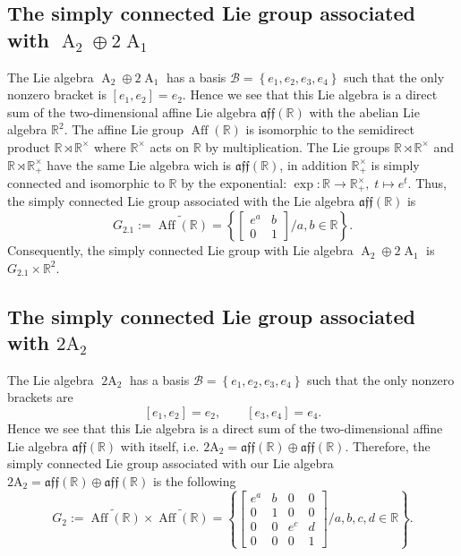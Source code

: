 \documentclass[12pt,a4paper,twoside]{article}
\theoremstyle{definition}
\begin{document}
\subsection{The simply connected Lie group associated with $\operatorname{A}_{2} \oplus 2\operatorname{A}_1$}
The Lie algebra $\operatorname{A}_{2} \oplus 2\operatorname{A}_1$ has a basis $\mathcal{B} = \left\lbrace e_1, e_2, e_3, e_4\right\rbrace$ such that the only nonzero bracket is $[e_1, e_2] = e_2$. Hence we see that this Lie algebra is a direct sum of the two-dimensional affine Lie algebra $\mathfrak{aff}(\mathbb{R})$ with the abelian Lie algebra $\mathbb{R}^2$. The affine Lie group $\operatorname{Aff}(\mathbb{R})$ is isomorphic to the semidirect product $\mathbb{R} \rtimes \mathbb{R}^{\times}$ where $\mathbb{R}^{\times}$ acts on $\mathbb{R}$ by multiplication. The Lie groups $\mathbb{R} \rtimes \mathbb{R}^{\times}$ and $\mathbb{R} \rtimes \mathbb{R}_{+}^{\times}$ have the same Lie algebra wich is $\mathfrak{aff}(\mathbb{R})$, in addition $\mathbb{R}_{+}^{\times}$ is simply connected and isomorphic to $\mathbb{R}$ by the exponential: $\exp: \mathbb{R} \longrightarrow \mathbb{R}_{+}^{\times}, \; t \longmapsto e^t$. Thus, the simply connected Lie group associated with the Lie algebra $\mathfrak{aff}(\mathbb{R})$ is
$$G_{2.1} := \widetilde{\operatorname{Aff}(\mathbb{R})} = \left\lbrace \begin{bmatrix}
e^a & b\\
0 & 1
\end{bmatrix} \big/ a, b \in \mathbb{R}\right\rbrace.$$
Consequently, the simply connected Lie group with Lie algebra $\operatorname{A}_{2} \oplus 2\operatorname{A}_1$ is $G_{2.1} \times \mathbb{R}^2$.
\subsection{The simply connected Lie group associated with $\operatorname{2A_2}$}
The Lie algebra $\operatorname{2A}_2$ has a basis $\mathcal{B} = \left\lbrace e_1, e_2, e_3, e_4\right\rbrace$ such that the only nonzero brackets are 
$$[e_1, e_2] = e_2, \qquad [e_3, e_4] = e_4.$$
Hence we see that this Lie algebra is a direct sum of the two-dimensional affine Lie algebra $\mathfrak{aff}(\mathbb{R})$ with itself, i.e. $\operatorname{2A_2} = \mathfrak{aff}(\mathbb{R}) \oplus \mathfrak{aff}(\mathbb{R})$. Therefore, the simply connected Lie group associated with our Lie algebra $\operatorname{2A_2} = \mathfrak{aff}(\mathbb{R}) \oplus \mathfrak{aff}(\mathbb{R})$ is the following
$$G_2 := \widetilde{\operatorname{Aff}(\mathbb{R})} \times \widetilde{\operatorname{Aff}(\mathbb{R})} = \left\lbrace \begin{bmatrix}
e^a & b & 0 & 0\\
0 & 1 & 0 & 0\\
0 & 0 & e^c & d\\
0 & 0 & 0 & 1
\end{bmatrix} \bigg/ a, b, c, d \in \mathbb{R}\right\rbrace.$$
\end{document}

